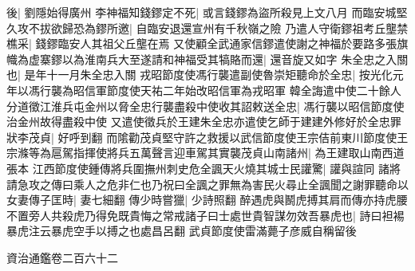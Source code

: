 後|{
	劉隱始得廣州}
李神福知錢鏐定不死|{
	或言錢鏐為盜所殺見上文八月}
而臨安城堅久攻不拔欲歸恐為鏐所邀|{
	自臨安退還宣州有千秋嶺之險}
乃遣人守衛鏐祖考丘壟禁樵采|{
	錢鏐臨安人其祖父丘壟在焉}
又使顧全武通家信鏐遣使謝之神福於要路多張旗幟為虚寨鏐以為淮南兵大至遂請和神福受其犒賂而還|{
	還音旋又如字}
朱全忠之入關也|{
	是年十一月朱全忠入關}
戎昭節度使馮行襲遣副使魯崇矩聽命於全忠|{
	按光化元年以馮行襲為昭信軍節度使天祐二年始改昭信軍為戎昭軍}
韓全誨遣中使二十餘人分道徵江淮兵屯金州以脅全忠行襲盡殺中使收其詔敕送全忠|{
	馮行襲以昭信節度使治金州故得盡殺中使}
又遣使徵兵於王建朱全忠亦遣使乞師于建建外修好於全忠罪狀李茂貞|{
	好呼到翻}
而隂勸茂貞堅守許之救援以武信節度使王宗佶前東川節度使王宗滌等為扈駕指揮使將兵五萬聲言迎車駕其實襲茂貞山南諸州|{
	為王建取山南西道張本}
江西節度使鍾傳將兵圍撫州刺史危全諷天火燒其城士民讙驚|{
	讙與諠同}
諸將請急攻之傳曰乘人之危非仁也乃祝曰全諷之罪無為害民火尋止全諷聞之謝罪聽命以女妻傳子匡時|{
	妻七細翻}
傳少時嘗獵|{
	少詩照翻}
醉遇虎與鬭虎搏其肩而傳亦持虎腰不置旁人共殺虎乃得免既貴悔之常戒諸子曰士處世貴智謀勿效吾暴虎也|{
	詩曰袒裼暴虎注云暴虎空手以搏之也處昌呂翻}
武貞節度使雷滿薨子彦威自稱留後

資治通鑑卷二百六十二
